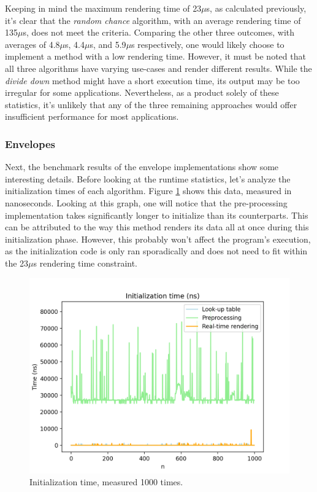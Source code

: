 \documentclass[10pt, twocolumn]{IEEEtran}
\begin{document}
Keeping in mind the maximum rendering time of 23$\mu$s, as calculated previously, it's clear that the \textit{random chance} algorithm, with an average rendering time of 135$\mu$s, does not meet the criteria. Comparing the other three outcomes, with averages of 4.8$\mu$s, 4.4$\mu$s, and 5.9$\mu$s respectively, one would likely choose to implement a method with a low rendering time. However, it must be noted that all three algorithms have varying use-cases and render different results. While the \textit{divide down} method might have a short execution time, its output may be too irregular for some applications. Nevertheless, as a product solely of these statistics, it's unlikely that any of the three remaining approaches would offer insufficient performance for most applications.\\

\subsubsection{Envelopes}
Next, the benchmark results of the envelope implementations show some interesting details. Before looking at the runtime statistics, let's analyze the initialization times of each algorithm. Figure \ref{fig:env_init_time} shows this data, measured in nanoseconds. Looking at this graph, one will notice that the pre-processing implementation takes significantly longer to initialize than its counterparts. This can be attributed to the way this method renders its data all at once during this initialization phase. However, this probably won't affect the program's execution, as the initialization code is only ran sporadically and does not need to fit within the 23$\mu$s rendering time constraint.\pagebreak
\begin{figure}[ht!]
	\includegraphics[width=\linewidth]{env_init_time.png}
	\caption{Initialization time, measured 1000 times.}
	\label{fig:env_init_time}
\end{figure}
\end{document}
